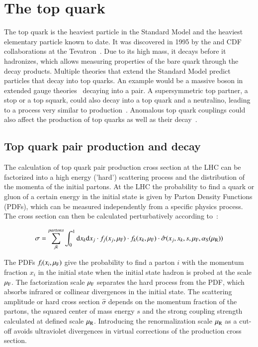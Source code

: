 \section{The top quark}
\label{sec:theo_top}

The top quark is the heaviest particle in the Standard Model and the heaviest elementary particle known to date. It was discovered in 1995 by the \DZERO and CDF collaborations at the Tevatron~\cite{PhysRevLett.74.2626,PhysRevLett.74.2632}. Due to its high mass, it decays before it hadronizes, which allows measuring properties of the bare quark through the decay products. Multiple theories that extend the Standard Model predict particles that decay into top quarks. An example would be a massive \zp boson in extended gauge theories~\cite{PhysRevD.63.035006,ROSNER1996113} decaying into a \ttbar pair. A supersymmetric top partner, a stop or a top squark, could also decay into a top quark and a neutralino, leading
to a process very similar to \ttbar production~\cite{NILLES19841,FARRAR1978575}. Anomalous top quark couplings could also affect the production of top quarks as well as their decay~\cite{PhysRevD.91.114010,PhysRevD.82.114008,PhysRevD.80.114017}.

\subsection{Top quark pair production and decay}
\label{sec:theo_prod}

The calculation of top quark pair production cross section at the LHC can be factorized into a high energy ('hard') scattering process and the distribution of the momenta of the initial partons.
At the LHC the probability to find a quark or gluon of a certain energy in the initial state is given by Parton Density Functions (PDFs), which can be measured independently from a specific physics process.
The cross section can then be calculated perturbatively according to~\cite{Husemann:2017eka}: 

\begin{equation}
\sigma = \sum_{jk}^{partons} \int_0^1 \mathrm{d}x_k\mathrm{d}x_j \cdot f_j(x_j,\mu_\mathrm{F}) \cdot f_k(x_k,\mu_\mathrm{F}) \cdot \hat{\sigma}(x_j,x_k,s,\mu_\mathrm{F},\alpha_\mathrm{S}(\mu_\mathrm{R}))
\end{equation}

The PDFs $f_i(x_i,\mu_\mathrm{F})$ give the probability to find a parton $i$ with the momentum fraction $x_i$ in the initial state when the initial state hadron is probed at the scale $\mu_\mathrm{F}$. The factorization scale $\mu_\mathrm{F}$ separates
the hard process from the PDF, which absorbs infrared or collinear divergences in the initial state. The scattering amplitude or hard cross section $\hat{\sigma}$ depends on the momentum fraction of the partons, the squared 
center of mass energy $s$ and the strong coupling strength \as calculated at defined scale $\mu_\mathrm{R}$. Introducing the renormalization scale $\mu_\mathrm{R}$ as a cut-off avoids ultraviolet divergences in virtual corrections of the production cross section.

